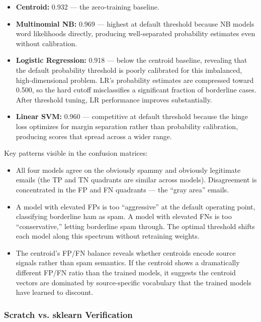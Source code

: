 \begin{itemize}
  \item \textbf{Centroid:} 0.932 — the zero-training baseline.
  \item \textbf{Multinomial NB:} 0.969 — highest at default threshold because NB models word likelihoods directly, producing well-separated probability estimates even without calibration.
  \item \textbf{Logistic Regression:} 0.918 — below the centroid baseline, revealing that the default probability threshold is poorly calibrated for this imbalanced, high-dimensional problem. LR's probability estimates are compressed toward 0.500, so the hard cutoff misclassifies a significant fraction of borderline cases. After threshold tuning, LR performance improves substantially.
  \item \textbf{Linear SVM:} 0.960 — competitive at default threshold because the hinge loss optimizes for margin separation rather than probability calibration, producing scores that spread across a wider range.
\end{itemize}

Key patterns visible in the confusion matrices:

\begin{itemize}
  \item All four models agree on the obviously spammy and obviously legitimate emails (the TP and TN quadrants are similar across models). Disagreement is concentrated in the FP and FN quadrants — the ``gray area'' emails.
  \item A model with elevated FPs is too ``aggressive'' at the default operating point, classifying borderline ham as spam. A model with elevated FNs is too ``conservative,'' letting borderline spam through. The optimal threshold shifts each model along this spectrum without retraining weights.
  \item The centroid's FP/FN balance reveals whether centroids encode source signals rather than spam semantics. If the centroid shows a dramatically different FP/FN ratio than the trained models, it suggests the centroid vectors are dominated by source-specific vocabulary that the trained models have learned to discount.
\end{itemize}

\subsubsection{Scratch vs. sklearn Verification}

